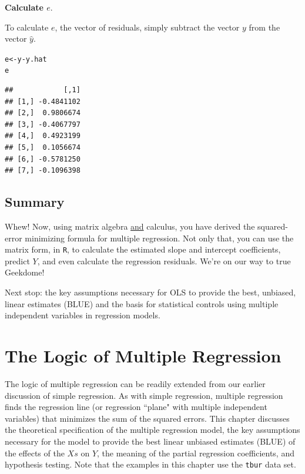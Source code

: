 \documentclass[11pt,openany]{book}\usepackage[]{graphicx}\usepackage[]{color}
\makeatletter
\newcommand{\hlopt}[1]{\textcolor[rgb]{0,0,0}{#1}}%
\newcommand{\hlstd}[1]{\textcolor[rgb]{0.345,0.345,0.345}{#1}}%
\newcommand{\hlkwb}[1]{\textcolor[rgb]{0.69,0.353,0.396}{#1}}%
\newenvironment{kframe}{%
 \def\at@end@of@kframe{}%
 \ifinner\ifhmode%
  \def\at@end@of@kframe{\end{minipage}}%
  \begin{minipage}{\columnwidth}%
 \fi\fi%
 \def\FrameCommand##1{\hskip\@totalleftmargin \hskip-\fboxsep
 \colorbox{shadecolor}{##1}\hskip-\fboxsep
     \hskip-\linewidth \hskip-\@totalleftmargin \hskip\columnwidth}%
 \MakeFramed {\advance\hsize-\width
   \@totalleftmargin\z@ \linewidth\hsize
   \@setminipage}}%
 {\par\unskip\endMakeFramed%
 \at@end@of@kframe}
\newenvironment{knitrout}{}{} %
\renewenvironment{knitrout}{\begin{singlespace}}{\end{singlespace}}
\makeatother
\begin{document}
\noindent \textbf{Calculate $e$}. 

\noindent To calculate $e$, the vector of residuals, simply subtract the vector $y$ from the vector $\hat y$. 
\begin{knitrout}
\color{fgcolor}\begin{kframe}
\begin{alltt}
\hlstd{e} \hlkwb{<-} \hlstd{y} \hlopt{-} \hlstd{y.hat}
\hlstd{e}
\end{alltt}
\begin{verbatim}
##            [,1]
## [1,] -0.4841102
## [2,]  0.9806674
## [3,] -0.4067797
## [4,]  0.4923199
## [5,]  0.1056674
## [6,] -0.5781250
## [7,] -0.1096398
\end{verbatim}
\end{kframe}
\end{knitrout}

\section{Summary}

Whew! Now, using matrix algebra \underline{and} calculus, you have derived the squared-error minimizing formula for multiple regression. Not only that, you can use the matrix form, in \texttt{R}, to calculate the estimated slope and intercept coefficients, predict $Y$,  and even calculate the regression residuals. We're on our way to true Geekdome!

Next stop: the key assumptions necessary for OLS to provide the best, unbiased, linear estimates (BLUE) and the basis for statistical controls using multiple independent variables in regression models.




\chapter{The Logic of Multiple Regression} 

The logic of multiple regression can be readily extended from our earlier discussion of simple regression. As with simple regression, multiple regression finds the regression line (or regression ``plane" with multiple independent variables) that minimizes the sum of the squared errors. This chapter discusses the theoretical specification of the multiple regression model, the key assumptions necessary for the model to provide the best linear unbiased estimates (BLUE) of the effects of the $Xs$ on $Y$, the meaning of the partial regression coefficients, and hypothesis testing. Note that the examples in this chapter use the \texttt{tbur} data set. 
\end{document}
